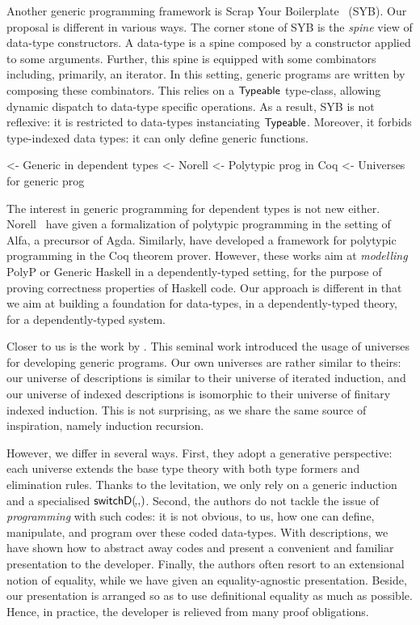 Another generic programming framework is Scrap Your
Boilerplate~\cite{spj:syb} (SYB). Our proposal is different in various
ways. The corner stone of SYB is the \emph{spine} view of data-type
constructors. A data-type is a spine composed by a constructor applied
to some arguments. Further, this spine is equipped with some
combinators including, primarily, an iterator. In this setting,
generic programs are written by composing these combinators. This
relies on a $\textsf{Typeable}$ type-class, allowing dynamic dispatch to
data-type specific operations. As a result, SYB is not reflexive: it
is restricted to data-types instanciating $\textsf{Typeable}$. Moreover,
it forbids type-indexed data types: it can only define generic
functions.


\begin{wstructure}
    <- Generic in dependent types
        <- Norell \cite{norell:msc-thesis}
        <- Polytypic prog in Coq \cite{verbruggen:polytype-coq}
        <- Universes for generic prog \cite{benke:universe-generic-prog}
\end{wstructure}

The interest in generic programming for dependent types is not new
either. Norell~\cite{norell:msc-thesis} have given a formalization of
polytypic programming in the setting of Alfa, a precursor of
Agda. Similarly, \citet{verbruggen:polytype-prog-coq,
  verbruggen:polytype-coq} have developed a framework for polytypic
programming in the Coq theorem prover. However, these works aim at
\emph{modelling} PolyP or Generic Haskell in a dependently-typed
setting, for the purpose of proving correctness properties of Haskell
code. Our approach is different in that we aim at building a
foundation for data-types, in a dependently-typed theory, for a
dependently-typed system.

Closer to us is the work by \citet{benke:universe-generic-prog}. This
seminal work introduced the usage of universes for developing generic
programs. Our own universes are rather similar to theirs: our universe
of descriptions is similar to their universe of iterated induction,
and our universe of indexed descriptions is isomorphic to their
universe of finitary indexed induction. This is not surprising, as we
share the same source of inspiration, namely induction recursion.

However, we differ in several ways. First, they adopt a generative
perspective: each universe extends the base type theory with both type
formers and elimination rules. Thanks to the levitation, we only rely
on a generic induction and a specialised
$\switchD{\!}{\!}{\!}$. Second, the authors do not tackle the issue of
\emph{programming} with such codes: it is not obvious, to us, how one
can define, manipulate, and program over these coded data-types. With
descriptions, we have shown how to abstract away codes and present a
convenient and familiar presentation to the developer. Finally, the
authors often resort to an extensional notion of equality, while we
have given an equality-agnostic presentation. Beside, our presentation
is arranged so as to use definitional equality as much as
possible. Hence, in practice, the developer is relieved from many
proof obligations.

